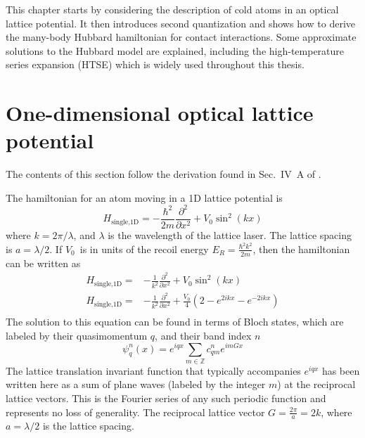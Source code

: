 \documentclass[oneside,11pt]{memoir}
\newcommand{\vo}{\ensuremath{V_{0}}}
\newcommand{\er}{\ensuremath{E_{R}}}
\begin{document}
This chapter starts by considering the description of cold atoms in an optical
lattice potential.  It then introduces second quantization and shows how to
derive the many-body Hubbard hamiltonian for contact interactions.  Some
approximate solutions to the Hubbard model are explained,  including the
high-temperature series expansion (HTSE) which is widely used throughout this
thesis.   

\section{One-dimensional optical lattice potential}

The contents of this section follow the derivation found in Sec.~IV~A of
\cite{RevModPhys.78.179}.

The hamiltonian for an atom moving in a 1D lattice potential is 
\begin{equation}
  H_{\text{single,1D}} = 
  - \frac{\hbar^{2}}{2m} \frac{\partial^{2}}{\partial x^{2}} 
  + \vo\sin^{2}(kx) 
 \label{eq:Hsingle1D}
\end{equation}
where $k=2\pi/\lambda$, and $\lambda$ is the wavelength of the lattice laser.
The lattice spacing is $a=\lambda/2$.  If \vo\ is in units of the recoil energy
$\er=\frac{\hbar^{2}k^{2}}{2m}$, then the hamiltonian can be written as
\begin{equation}
\begin{split}
  H_{\text{single,1D}}= &
    -\frac{1}{k^{2}} \frac{\partial^{2}}{\partial x^{2}} 
    + \vo\sin^{2}(kx) \\
  H_{\text{single,1D}} = &
    -\frac{1}{k^{2}} \frac{\partial^{2}}{\partial x^{2}} 
    + \frac{\vo}{4}(2 - e^{2ikx} - e^{-2ikx} )  \\
\end{split}
\end{equation}
The solution to this equation can be found in terms of Bloch states, which are
labeled by their quasimomentum $q$, and their band index $n$ \begin{equation}
  \psi_{q}^{n}(x) = e^{iqx} \sum_{m \in \mathbb{Z}} c_{qm}^{n} e^{imGx}
  \label{eq:blochstate}
\end{equation}
The lattice translation invariant function that typically accompanies $e^{iqx}$
has been written here as a sum of plane waves (labeled by the integer $m$) at
the reciprocal lattice vectors.  This is the Fourier series of any such
periodic function and represents no loss of generality.   The reciprocal
lattice vector  $G=\frac{2\pi}{a}=2k$, where $a=\lambda/2$ is the lattice
spacing.  
\end{document}
